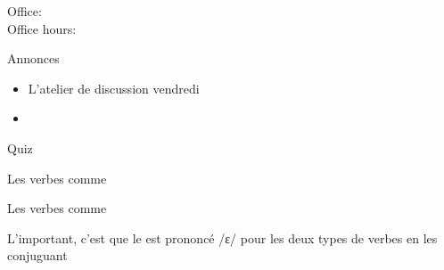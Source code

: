 \documentclass{beamer}
\subtitle[Repas et verbes (\lexi{acheter} et \lexi{appeler})]{Les repas et les verbes comme \lexi{acheter} et \lexi{appeler}}
\begin{document}
  \begin{frame}
    \titlepage
    \tiny{Office: \\
          Office hours: }
  \end{frame}

  \begin{frame}{Annonces}
    \begin{itemize}
      \item L'atelier de discussion vendredi
      \item[] 
    \end{itemize}
  \end{frame}

  \begin{frame}{}
    \begin{center}
      \Large Quiz
    \end{center}
  \end{frame}

  \begin{frame}{Les verbes comme }
    \begin{center}
      
    \end{center}
  \end{frame}

  \begin{frame}{Les verbes comme }
    \begin{center}
      
    \end{center}
    L'important, c'est que le  est prononcé /ɛ/ pour les deux types de verbes en les conjuguant\\
  \end{frame}
\end{document}
